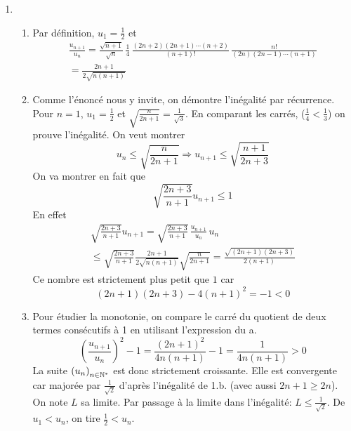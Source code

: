 \begin{enumerate}
 \item 
\begin{enumerate}
 \item Par définition, $u_1=\frac{1}{2}$ et
\begin{multline*}
 \frac{u_{n+1}}{u_n}=
\frac{\sqrt{n+1}}{\sqrt{n}}\,\frac{1}{4}\,\frac{(2n+2)(2n+1)\cdots (n+2)}{(n+1)!}\,\frac{n!}{(2n)(2n-1)\cdots(n+1)}\\
=\frac{2n+1}{2\sqrt{n(n+1)}}
\end{multline*}

 \item Comme l'énoncé nous y invite, on démontre l'inégalité par récurrence. Pour $n=1$, $u_1=\frac{1}{2}$ et $\sqrt{\frac{n}{2n+1}}=\frac{1}{\sqrt{3}}$. En comparant les carrés, ($\frac{1}{4}<\frac{1}{3}$) on prouve l'inégalité.\newline
On veut montrer
\begin{displaymath}
 u_n\leq \sqrt{\frac{n}{2n+1}}  \Rightarrow u_{n+1}\leq \sqrt{\frac{n+1}{2n+3}} 
\end{displaymath}
On va montrer en fait que
\begin{displaymath}
 \sqrt{\frac{2n+3}{n+1}}u_{n+1}\leq 1
\end{displaymath}
En effet 
\begin{multline*}
 \sqrt{\frac{2n+3}{n+1}}u_{n+1}=\sqrt{\frac{2n+3}{n+1}}\,\frac{u_{n+1}}{u_n}\,u_n\\
\leq \sqrt{\frac{2n+3}{n+1}} \frac{2n+1}{2\sqrt{n(n+1)}}\sqrt{\frac{n}{2n+1}}
=\frac{\sqrt{(2n+1)(2n+3)}}{2(n+1)}
\end{multline*}
Ce nombre est strictement plus petit que $1$ car
\begin{displaymath}
 (2n+1)(2n+3)-4(n+1)^2 = -1 < 0
\end{displaymath}

 \item Pour étudier la monotonie, on compare le carré du quotient de deux termes consécutifs à 1 en utilisant l'expression du a.
\begin{displaymath}
 \left( \frac{u_{n+1}}{u_n}\right)^2 -1
=\frac{(2n+1)^2}{4n(n+1)}-1=\frac{1}{4n(n+1)}> 0 
\end{displaymath}
La suite $\left( u_n\right) _{n\in \mathbb{N}^*}$ est donc strictement croissante. Elle est convergente car majorée par $\frac{1}{\sqrt{2}}$ d'après l'inégalité de 1.b. (avec aussi $2n+1 \geq 2n$). On note $L$ sa limite.\newline
Par passage à la limite dans l'inégalité: $L\leq \frac{1}{\sqrt{2}}$. De $u_1<u_n$, on tire $\frac{1}{2}<u_n$.
\end{enumerate}


\end{enumerate}
